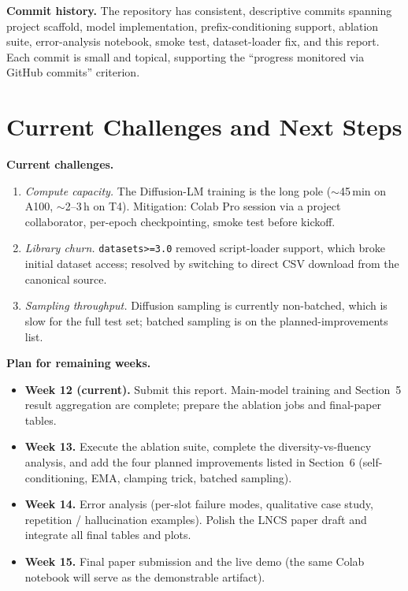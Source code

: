 \documentclass[11pt,a4paper]{article}
\begin{document}
\textbf{Commit history.} The repository has consistent, descriptive commits
spanning project scaffold, model implementation, prefix-conditioning support,
ablation suite, error-analysis notebook, smoke test, dataset-loader fix, and
this report. Each commit is small and topical, supporting the
``progress monitored via GitHub commits'' criterion.

\section{Current Challenges and Next Steps}

\textbf{Current challenges.}
\begin{enumerate}
  \item \emph{Compute capacity.} The Diffusion-LM training is the long pole
        (\(\sim\)45\,min on A100, \(\sim\)2--3\,h on T4). Mitigation:
        Colab Pro session via a project collaborator, per-epoch
        checkpointing, smoke test before kickoff.
  \item \emph{Library churn.} \texttt{datasets>=3.0} removed script-loader
        support, which broke initial dataset access; resolved by switching
        to direct CSV download from the canonical source.
  \item \emph{Sampling throughput.} Diffusion sampling is currently
        non-batched, which is slow for the full test set; batched sampling
        is on the planned-improvements list.
\end{enumerate}

\textbf{Plan for remaining weeks.}
\begin{itemize}
  \item \textbf{Week 12 (current).} Submit this report. Main-model training
        and Section~5 result aggregation are complete; prepare the ablation
        jobs and final-paper tables.
  \item \textbf{Week 13.} Execute the ablation suite, complete the
        diversity-vs-fluency analysis, and add the four planned improvements
        listed in Section~6 (self-conditioning, EMA, clamping trick, batched
        sampling).
  \item \textbf{Week 14.} Error analysis (per-slot failure modes, qualitative
        case study, repetition / hallucination examples). Polish the LNCS
        paper draft and integrate all final tables and plots.
  \item \textbf{Week 15.} Final paper submission and the live demo (the same
        Colab notebook will serve as the demonstrable artifact).
\end{itemize}
\end{document}
